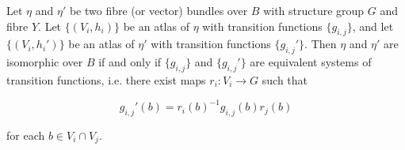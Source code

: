 Let $\eta$ and $\eta'$ be two fibre (or vector) bundles over $B$ with structure group $G$ and fibre $Y$. Let $\{(V_i, h_i)\}$ be an atlas of $\eta$ with transition functions $\{g_{i,j}\}$, and let $\{(V_i, h_i')\}$ be an atlas of $\eta'$ with transition functions $\{g_{i,j}'\}$. Then $\eta$ and $\eta'$ are isomorphic over $B$ if and only if $\{g_{i,j}\}$ and $\{g_{i,j}'\}$ are equivalent systems of transition functions, i.e. there exist maps $r_i: V_i \to G$ such that

$$g_{i,j}'(b) = r_i(b)^{-1} g_{i,j}(b) r_j(b)$$

for each $b \in V_i \cap V_j$.

